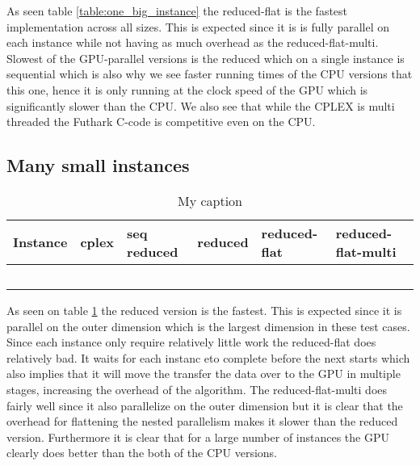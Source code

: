 As seen table \ref{table:one_big_instance} the reduced-flat is the fastest implementation across all sizes. This is expected since it is is fully parallel on each instance while not having as much overhead as the reduced-flat-multi. Slowest of the GPU-parallel versions is the reduced which on a single instance is sequential which is also why we see faster running times of the CPU versions that this one, hence it is only running at the clock speed of the GPU which is significantly slower than the CPU. We also see that while the CPLEX is multi threaded the Futhark C-code is competitive even on the CPU. 

\subsection{Many small instances}
\begin{table}[H]
	\centering
	\label{table:many_small_instances}
	\begin{tabular}{|l|l|l|l|l|l|}\hline
		Instance & cplex & seq reduced & reduced & reduced-flat & reduced-flat-multi \\\hline
		&       &             &         &              &                    \\\hline
		&       &             &         &              &                    \\\hline
		&       &             &         &              &                   \\\hline
		&       &             &         &              &                   \\\hline
		&       &             &         &              &                   \\\hline
	\end{tabular}
	\caption{My caption}
\end{table}


As seen on table \ref{table:many_small_instances} the reduced version is the fastest. This is expected since it is parallel on the outer dimension which is the largest dimension in these test cases. Since each instance only require relatively little work the reduced-flat does relatively bad. It waits for each instanc eto complete before the next starts which also implies that it will move the transfer the data over to the GPU in multiple stages, increasing the overhead of the algorithm. The reduced-flat-multi does fairly well since it also parallelize on the outer dimension but it is clear that the overhead for flattening the nested parallelism makes it slower than the reduced version. Furthermore it is clear that for a large number of instances the GPU clearly does better than the both of the CPU versions.



